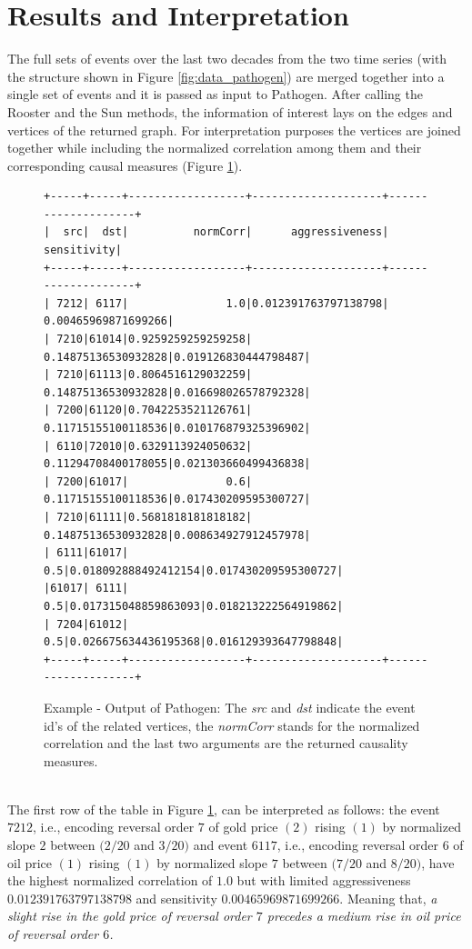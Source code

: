 \documentclass[a4, 11pt]{article}
\begin{document}
\section{Results and Interpretation}
The full sets of events over the last two decades from the two time series (with the structure shown in Figure \ref{fig:data_pathogen}) are merged together into a single set of events and it is passed as input to Pathogen. After calling the Rooster and the Sun methods, the information of interest lays on the edges and vertices of the returned graph. For interpretation purposes the vertices are joined together while including the normalized correlation among them and their corresponding causal measures (Figure \ref{fig:graph}).
\begin{figure}[!ht]
\centering
    \begin{BVerbatim}[baselinestretch=0.1,fontsize=\fontsize{12}{0}\selectfont]
+-----+-----+------------------+--------------------+--------------------+
|  src|  dst|          normCorr|      aggressiveness|         sensitivity|
+-----+-----+------------------+--------------------+--------------------+
| 7212| 6117|               1.0|0.012391763797138798| 0.00465969871699266|
| 7210|61014|0.9259259259259258| 0.14875136530932828|0.019126830444798487|
| 7210|61113|0.8064516129032259| 0.14875136530932828|0.016698026578792328|
| 7200|61120|0.7042253521126761| 0.11715155100118536|0.010176879325396902|
| 6110|72010|0.6329113924050632| 0.11294708400178055|0.021303660499436838|
| 7200|61017|               0.6| 0.11715155100118536|0.017430209595300727|
| 7210|61111|0.5681818181818182| 0.14875136530932828|0.008634927912457978|
| 6111|61017|               0.5|0.018092888492412154|0.017430209595300727|
|61017| 6111|               0.5|0.017315048859863093|0.018213222564919862|
| 7204|61012|               0.5|0.026675634436195368|0.016129393647798848|
+-----+-----+------------------+--------------------+--------------------+
    \end{BVerbatim}
    \caption{Example - Output of Pathogen: The \textit{src} and \textit{dst} indicate the event id's of the related vertices, the \textit{normCorr} stands for the normalized correlation and the last two arguments are the returned causality measures.}
    \label{fig:graph}
\end{figure}
\\The first row of the table in Figure \ref{fig:graph},  can be interpreted as follows: the event $7212$, i.e., encoding reversal order $7$ of gold price $(2)$ rising $(1)$ by normalized slope $2$ between $(2/20$ and $3/20)$ and event $6117$, i.e., encoding reversal order $6$ of oil price $(1)$ rising $(1)$ by normalized slope $7$ between $(7/20$ and $8/20)$, have the highest normalized correlation of $1.0$ but with limited aggressiveness $0.012391763797138798$ and sensitivity $0.00465969871699266$. Meaning that, \textit{a slight rise in the gold price of reversal order $7$ precedes a medium rise in oil price of reversal order $6$.}\\[3ex]
\end{document}
